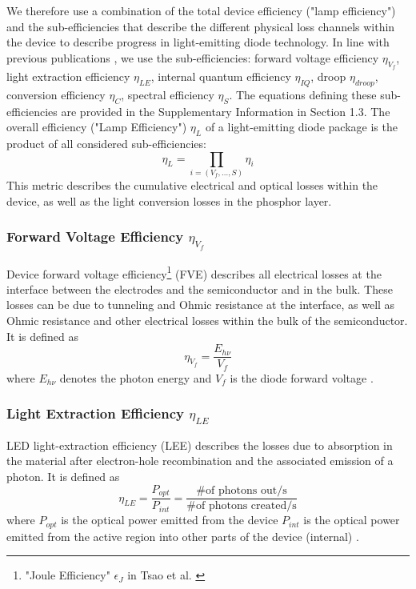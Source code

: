 \documentclass[parskip=full]{article}
\begin{document}
We therefore use a combination of the total device efficiency ("lamp efficiency") and the sub-efficiencies that describe the different physical loss channels within the device to describe progress in light-emitting diode technology. In line with previous publications \cite{schubert2018light,tsao2010solid}, we use the sub-efficiencies: forward voltage efficiency $\eta_{V_f}$, light extraction efficiency $\eta_{LE}$, internal quantum efficiency $\eta_{IQ}$, droop $\eta_{droop}$, conversion efficiency $\eta_{C}$, spectral efficiency $\eta_{S}$. The equations defining these sub-efficiencies are provided in the Supplementary Information in Section 1.3. The overall efficiency ("Lamp Efficiency") $\eta_L$ of a light-emitting diode package is the product of all considered sub-efficiencies:
%
\begin{equation}
    \eta_L = \prod_{i=(V_f, \dots, S)} \eta_i
\end{equation}
%
This metric describes the cumulative electrical and optical losses within the device, as well as the light conversion losses in the phosphor layer.

\subsubsection{Forward Voltage Efficiency $\eta_{V_f}$}

Device forward voltage efficiency\footnote{"Joule Efficiency" $\epsilon_J$ in Tsao et al. \cite{tsao2010solid}} (FVE) describes all electrical losses at the interface between the electrodes and the semiconductor and in the bulk. These losses can be due to tunneling and Ohmic resistance at the interface, as well as Ohmic resistance and other electrical losses within the bulk of the semiconductor. It is defined as
%
\begin{equation}
    \eta_{V_f} = \frac{E_{h\nu}}{V_f}
\end{equation}
%
where $E_{h\nu}$ denotes the photon energy and $V_f$ is the diode forward voltage \cite{schubert2018light}\cite{tsao2010solid}.

\subsubsection{Light Extraction Efficiency $\eta_{LE}$}

LED light-extraction efficiency (LEE) describes the  losses due to absorption in the material after electron-hole recombination and the associated emission of a photon. It is defined as
%
\begin{equation}
    \eta_{LE} = \frac{P_{opt}}{P_{int}} = \frac{\text{\# of photons out/s}}{\text{\# of photons created/s}}
\end{equation}
%
where $P_{opt}$ is the optical power emitted from the device $P_{int}$ is the optical power emitted from the active region into other parts of the device (internal) \cite{schubert2018light}\cite{tsao2010solid}.
\end{document}
